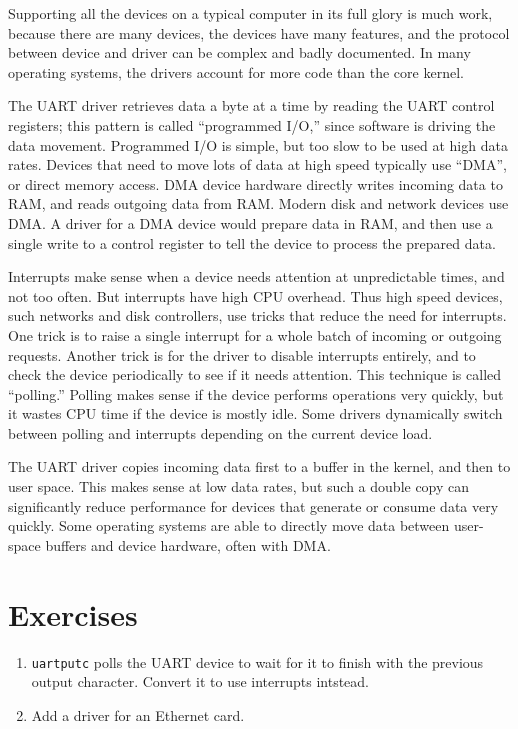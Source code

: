 Supporting all the devices on a typical computer in its full glory is
much work, because there are many devices, the devices have many
features, and the protocol between device and driver can be complex
and badly documented. In many operating systems, the drivers account
for more code than the core kernel.

The UART driver retrieves data a byte at a time by reading the UART
control registers; this pattern is called ``programmed I/O,'' since
software is driving the data movement. Programmed I/O is simple, but
too slow to be used at high data rates. Devices that need to move lots
of data at high speed typically use ``DMA'', or direct memory access.
DMA device hardware directly writes incoming data to RAM, and reads
outgoing data from RAM. Modern disk and network devices use DMA. A
driver for a DMA device would prepare data in RAM, and then use a
single write to a control register to tell the device to process the
prepared data.

Interrupts make sense when a device needs attention at unpredictable
times, and not too often. But interrupts have high CPU overhead. Thus
high speed devices, such networks and disk controllers, use tricks
that reduce the need for interrupts. One trick is to raise a single
interrupt for a whole batch of incoming or outgoing requests. Another
trick is for the driver to disable interrupts entirely, and to check
the device periodically to see if it needs attention. This technique
is called ``polling.'' Polling makes sense if the device performs
operations very quickly, but it wastes CPU time if the device is mostly
idle. Some drivers dynamically switch between polling and interrupts
depending on the current device load.

The UART driver copies incoming data first to a buffer in the kernel,
and then to user space. This makes sense at low data rates, but such a
double copy can significantly reduce performance for devices that
generate or consume data very quickly. Some operating systems are able
to directly move data between user-space buffers and device hardware,
often with DMA.

\section{Exercises}

\begin{enumerate}

\item {\tt uartputc}  polls the
  UART device to wait for it to finish with the previous output
  character. Convert it to use interrupts intstead.
  
\item Add a driver for an Ethernet card.

\end{enumerate}
